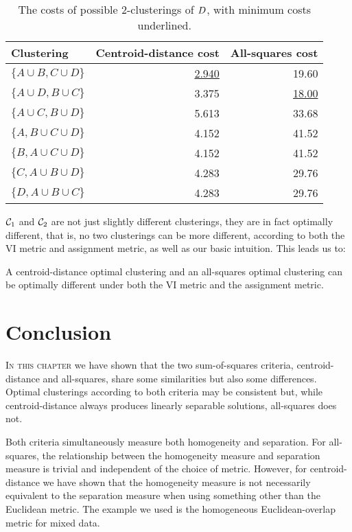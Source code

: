 \begin{table}
  \centering
  \caption{The costs of possible 2-clusterings
    of $D$, with minimum costs underlined.}
  \begin{tabular}{lrr}
  \toprule
  Clustering & Centroid-distance cost & All-squares cost \\
  \midrule
  $\{A \cup B, C \cup D\}$ & \underline{2.940} & 19.60 \\
  $\{A \cup D, B \cup C\}$ & 3.375 & \underline{18.00} \\
  $\{A \cup C, B \cup D\}$ & 5.613 & 33.68 \\
  $\{A, B \cup C \cup D\}$ & 4.152 & 41.52 \\
  $\{B, A \cup C \cup D\}$ & 4.152 & 41.52 \\
  $\{C, A \cup B \cup D\}$ & 4.283 & 29.76 \\
  $\{D, A \cup B \cup C\}$ & 4.283 & 29.76 \\
  \bottomrule
\end{tabular}
\label{tab:costs}
\end{table}


$\mathcal{C}_1$ and $\mathcal{C}_2$ are not just slightly different clusterings, they are
in fact optimally different, that is, no two clusterings can be more
different, according to both the VI metric and assignment metric, as well as
our basic intuition.  This leads us to:
\begin{thm}
  \label{thm:worst-case}
  A centroid-distance optimal clustering and an all-squares optimal clustering
  can be optimally different under both the VI metric and the assignment
  metric.
\end{thm}

\section{Conclusion}
\label{sec:conclusion-sumsq}

\textsc{In this chapter} we have shown that the two sum-of-squares criteria,
centroid-distance and all-squares, share some similarities but also some
differences.  Optimal clusterings according to both criteria may be consistent
but, while centroid-distance always produces linearly separable solutions,
all-squares does not.

Both criteria simultaneously measure both homogeneity and separation.  For
all-squares, the relationship between the homogeneity measure and separation
measure is trivial and independent of the choice of metric.  However, for
centroid-distance we have shown that the homogeneity measure is not
necessarily equivalent to the separation measure when using something other
than the Euclidean metric.  The example we used is the homogeneous
Euclidean-overlap metric for mixed data.

